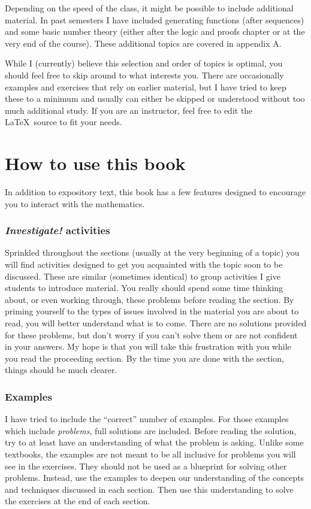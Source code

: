 Depending on the speed of the class, it might be possible to include additional material.  In past semesters I have included generating functions (after sequences) and some basic number theory (either after the logic and proofs chapter or at the very end of the course).  These additional topics are covered in appendix A.

While I (currently) believe this selection and order of topics is optimal, you should feel free to skip around to what interests you.  There are occasionally examples and exercises that rely on earlier material, but I have tried to keep these to a minimum and usually can either be skipped or understood without too much additional study.  If you are an instructor, feel free to edit the \LaTeX\ source to fit your needs.


\section*{How to use this book}\label{sec:howto}

In addition to expository text, this book has a few features designed to encourage you to interact with the mathematics.

\subsubsection*{\textit{Investigate!} activities}  Sprinkled throughout the sections (usually at the very beginning of a topic) you will find activities designed to get you acquainted with the topic soon to be discussed.  These are similar (sometimes identical) to group activities I give students to introduce material.  You really should spend some time thinking about, or even working through, these problems before reading the section.  By priming yourself to the types of issues involved in the material you are about to read, you will better understand what is to come.  There are no solutions provided for these problems, but don't worry if you can't solve them or are not confident in your answers.  My hope is that you will take this frustration with you while you read the proceeding section.  By the time you are done with the section, things should be much clearer.

\subsubsection*{Examples}

I have tried to include the ``correct'' number of examples.  For those examples which include \emph{problems}, full solutions are included. Before reading the solution, try to at least have an understanding of what the problem is asking.  Unlike some textbooks, the examples are not meant to be all inclusive for problems you will see in the exercises.  They should not be used as a blueprint for solving other problems.  Instead, use the examples to deepen our understanding of the concepts and techniques discussed in each section.  Then use this understanding to solve the exercises at the end of each section.

